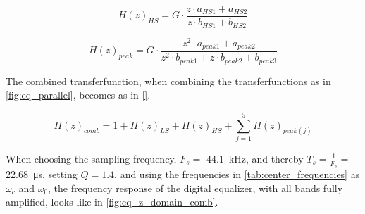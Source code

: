     \startexplain
    \stopexplain
    
\begin{equation}\label{eq:Hz_HS}
        H(z)_{HS} = G \cdot \frac{z \cdot a_{HS1} + a_{HS2}}{z \cdot b_{HS1} + b_{HS2}}
    \end{equation}
    
    \startexplain
    \stopexplain

\begin{equation}\label{eq:Hz_peak}
        H(z)_{peak} = G \cdot \frac{z^2 \cdot a_{peak1} + a_{peak2}}{z^2 \cdot b_{peak1} + z \cdot b_{peak2} + b_{peak3}}
    \end{equation}
    
    \startexplain
    \stopexplain

The combined transferfunction, when combining the transferfunctions as in \autoref{fig:eq_parallel}, becomes as in \autoref{}.

\begin{equation}\label{eq:z_to_n_final}
        H(z)_{comb} = 1 + H(z)_{LS} + H(z)_{HS} +  \sum_{j=1}^{5} H(z)_{peak(j)}
    \end{equation}

When choosing the sampling frequency, $F_s =$ \SI{44.1}{\kilo \hertz}, and thereby $T_s = \frac{1}{F_s} =$ \SI{22.68}{\micro \second}, setting $Q = 1.4$, and using the frequencies in \autoref{tab:center_frequencies} as $\omega_c$ and $\omega_0$, the frequency response of the digital equalizer, with all bands fully amplified, looks like in \autoref{fig:eq_z_domain_comb}.

